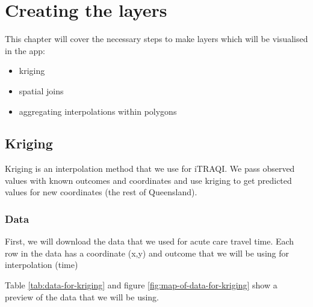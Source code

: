 \documentclass[
]{book}
\providecommand{\tightlist}{%
  \setlength{\itemsep}{0pt}\setlength{\parskip}{0pt}}
\begin{document}
\hypertarget{building}{%
\chapter{Creating the layers}\label{building}}

This chapter will cover the necessary steps to make layers which will be visualised in the app:

\begin{itemize}
\tightlist
\item
  kriging
\item
  spatial joins
\item
  aggregating interpolations within polygons
\end{itemize}

\hypertarget{kriging}{%
\section{Kriging}\label{kriging}}

Kriging is an interpolation method that we use for iTRAQI. We pass observed values with known outcomes and coordinates and use kriging to get predicted values for new coordinates (the rest of Queensland).

\hypertarget{data}{%
\subsection{Data}\label{data}}

First, we will download the data that we used for acute care travel time. Each row in the data has a coordinate (x,y) and outcome that we will be using for interpolation (time)

Table \ref{tab:data-for-kriging} and figure \ref{fig:map-of-data-for-kriging} show a preview of the data that we will be using.
\end{document}
